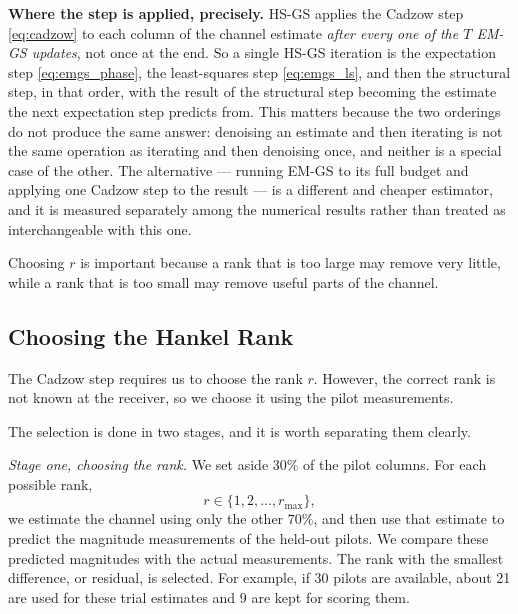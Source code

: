 \documentclass[journal]{IEEEtran}
\newcommand{\rmax}{r_{\mathrm{max}}}
\begin{document}
\textbf{Where the step is applied, precisely.} HS-GS applies the Cadzow step
\eqref{eq:cadzow} to each column of the channel estimate \emph{after every one
of the $T$ EM-GS updates}, not once at the end. So a single HS-GS iteration is
the expectation step \eqref{eq:emgs_phase}, the least-squares step
\eqref{eq:emgs_ls}, and then the structural step, in that order, with the
result of the structural step becoming the estimate the next expectation step
predicts from. This matters because the two orderings do not produce the same
answer: denoising an estimate and then iterating is not the same operation as
iterating and then denoising once, and neither is a special case of the other.
The alternative --- running EM-GS to its full budget and applying one Cadzow
step to the result --- is a different and cheaper estimator, and it is measured
separately among the numerical results rather than treated as interchangeable
with this one.

Choosing $r$ is important because a rank that is too large may remove very
little, while a rank that is too small may remove useful parts of the channel.

\subsection{Choosing the Hankel Rank}

The Cadzow step requires us to choose the rank $r$. However, the correct rank
is not known at the receiver, so we choose it using the pilot measurements.

The selection is done in two stages, and it is worth separating them clearly.

\emph{Stage one, choosing the rank.} We set aside $30\%$ of the pilot columns.
For each possible rank,
\begin{equation}
r\in\{1,2,\ldots,\rmax\},
\end{equation}
we estimate the channel using only the other $70\%$, and then use that estimate
to predict the magnitude measurements of the held-out pilots. We compare these
predicted magnitudes with the actual measurements. The rank with the smallest
difference, or residual, is selected. For example, if 30 pilots are available,
about 21 are used for these trial estimates and 9 are kept for scoring them.
\end{document}
